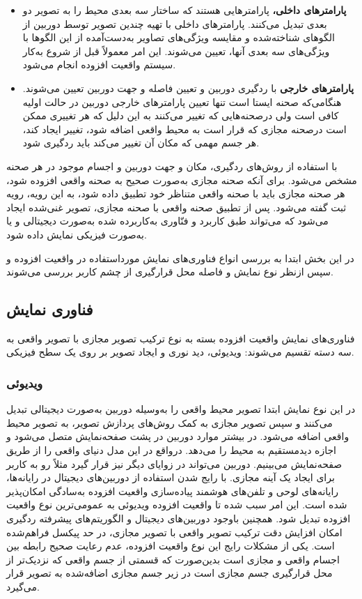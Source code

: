 \begin{itemize}
	\item \textbf{پارامترهای داخلی، }
 پارامترهایی هستند که ساختار سه بعدی محیط را به تصویر دو بعدی تبدیل می‌کنند. پارامترهای داخلی با تهیه چندین تصویر توسط دوربین از الگوهای شناخته‌شده و مقایسه ویژگی‌های تصاویر به‌دست‌آمده از این الگوها با ویژگی‌های سه بعدی آنها، تعیین می‌شوند. این امر معمولاً قبل از شروع به‌کار سیستم واقعیت افزوده انجام می‌شود.
 \item \textbf{پارامترهای خارجی}
   با ردگیری دوربین و تعیین فاصله و جهت دوربین تعیین می‌شوند. هنگامی‌که صحنه ایستا است تنها تعیین پارامترهای خارجی دوربین در حالت اولیه کافی است ولی درصحنه‌هایی که تغییر می‌کنند به این دلیل که هر تغییری ممکن است درصحنه مجازی که قرار است به محیط واقعی اضافه شود، تغییر ایجاد کند، هر جسم مهمی که مکان آن تغییر می‌کند باید ردگیری شود\cite{Billinghurst}.
\end{itemize}
با استفاده از روش‌های ردگیری، مکان و جهت دوربین و اجسام موجود در هر صحنه مشخص می‌شود. برای آنکه صحنه مجازی به‌صورت صحیح به صحنه واقعی افزوده شود، هر صحنه مجازی باید با صحنه واقعی متناظر خود تطبیق داده شود، به این رویه، رویه ثبت گفته می‌شود. پس از تطبیق صحنه واقعی با صحنه مجازی، تصویر غنی‌شده ایجاد می‌شود که می‌تواند طبق کاربرد و فنّاوری به‌کاربرده شده به‌صورت دیجیتالی و یا به‌صورت فیزیکی نمایش داده شود.

در این بخش ابتدا به بررسی انواع فناوری‌های نمایش مورداستفاده در واقعیت افزوده و سپس ازنظر نوع نمایش و فاصله محل قرارگیری از چشم کاربر بررسی می‌شوند.
\subsection{فناوری نمایش}
فناوری‌های نمایش واقعیت افزوده بسته به نوع ترکیب تصویر مجازی با تصویر واقعی به سه دسته تقسیم می‌شوند: ویدیوئی، دید نوری و ایجاد تصویر بر روی یک سطح فیزیکی.
\subsubsection{ویدیوئی}
در این نوع نمایش ابتدا تصویر محیط واقعی را به‌وسیله دوربین به‌صورت دیجیتالی تبدیل می‌کنند و سپس تصویر مجازی به کمک روش‌های پردازش تصویر، به تصویر محیط واقعی اضافه می‌شود. در بیشتر موارد دوربین در پشت صفحه‌نمایش متصل می‌شود و اجازه دیدمستقیم به محیط را می‌دهد. درواقع در این مدل دنیای واقعی را از طریق صفحه‌نمایش می‌بینیم. دوربین می‌تواند در زوایای دیگر نیز قرار گیرد مثلاً رو به کاربر برای ایجاد یک آینه مجازی\cite{Billinghurst}.
با رایج شدن استفاده از دوربین‌های دیجیتال در رایانه‌ها، رایانه‌های لوحی و تلفن‌های هوشمند پیاده‌سازی واقعیت افزوده به‌سادگی امکان‌پذیر شده است. این امر سبب شده تا واقعیت افزوده ویدیوئی به عمومی‌ترین نوع واقعیت افزوده تبدیل شود. همچنین باوجود دوربین‌های دیجیتال و الگوریتم‌های پیشرفته ردگیری امکان افزایش دقت ترکیب تصویر واقعی با تصویر مجازی، در حد پیکسل فراهم‌شده است. یکی از مشکلات رایج این نوع واقعیت افزوده، عدم رعایت صحیح رابطه بین اجسام واقعی و مجازی است بدین‌صورت که قسمتی از جسم واقعی که نزدیک‌تر از محل قرارگیری جسم مجازی است در زیر جسم مجازی اضافه‌شده به تصویر قرار می‌گیرد\cite{Tian}.

